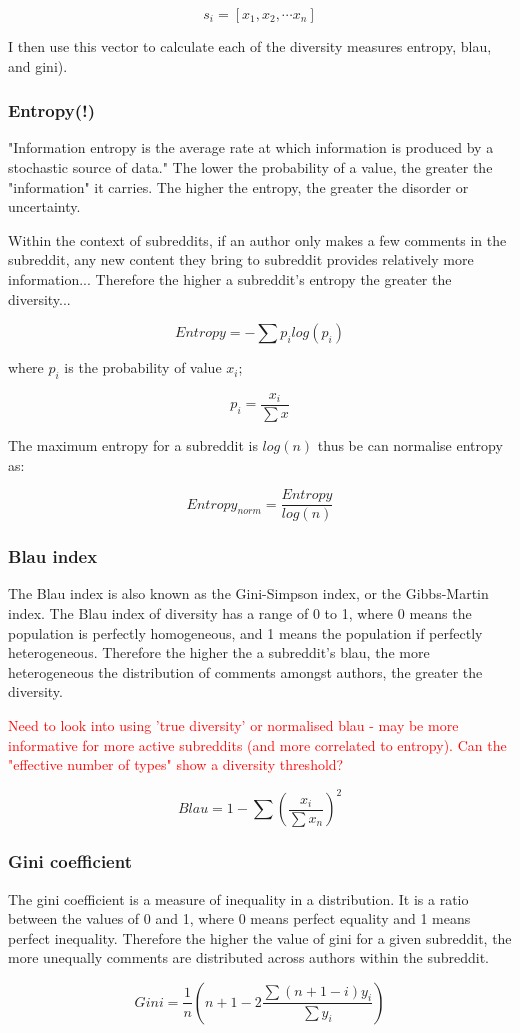 $$s_i = [x_1, x_2, \cdots x_n]$$

I then use this vector to calculate each of the diversity measures entropy, blau, and gini).


\subsubsection{Entropy(!)} \label{entropy}

"Information entropy is the average rate at which information is produced by a stochastic source of data." The lower the probability of a value, the greater the "information" it carries. The higher the entropy, the greater the disorder or uncertainty.

Within the context of subreddits, if an author only makes a few comments in the subreddit, any new content they bring to subreddit provides relatively more information... Therefore the higher a subreddit's entropy the greater the diversity...


$$Entropy = -\sum p_ilog(p_i)$$

where $p_i$ is the probability of value $x_i$;

$$p_i = \frac{x_i}{\sum x}$$

The maximum entropy for a subreddit is $log(n)$ thus be can normalise entropy as:

$$Entropy_{norm} = \frac{Entropy}{log(n)}$$

\subsubsection{Blau index} \label{blau index}

The Blau index is also known as the Gini-Simpson index, or the Gibbs-Martin index. The Blau index of diversity has a range of 0 to 1, where 0 means the population is perfectly homogeneous, and 1 means the population if perfectly heterogeneous. Therefore the higher the a subreddit's blau, the more heterogeneous the distribution of comments amongst authors, the greater the diversity.


\textcolor{red}{Need to look into using 'true diversity' or normalised blau - may be more informative for more active subreddits (and more correlated to entropy). Can the "effective number of types" show a diversity threshold?}

$$Blau = 1 - \sum (\frac{x_i}{\sum x_n})^{2}$$

\subsubsection{Gini coefficient} \label{gini}

The gini coefficient is a measure of inequality in a distribution. It is a ratio between the values of 0 and 1, where 0 means perfect equality and 1 means perfect inequality. Therefore the higher the value of gini for a given subreddit, the more unequally comments are distributed across authors within the subreddit.

$$Gini = \frac{1}{n}(n+1-2\frac{\sum(n+1-i)y_i}{\sum y_i})$$